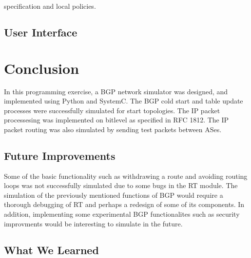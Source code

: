 specification and local policies. \hypertarget{index_sub_UI}{}\subsection{User Interface}\label{index_sub_UI}
\hypertarget{index_s_conclusion}{}\section{Conclusion}\label{index_s_conclusion}
In this programming exercise, a B\-G\-P network simulator was designed, and implemented using Python and System\-C. The B\-G\-P cold start and table update processes were successfully simulated for start topologies. The I\-P packet processesing was implemented on bitlevel as specified in R\-F\-C 1812. The I\-P packet routing was also simulated by sending test packets between A\-Ses. \hypertarget{index_sub_futureImprovements}{}\subsection{Future Improvements}\label{index_sub_futureImprovements}
Some of the basic functionality such as withdrawing a route and avoiding routing loops was not successfully simulated due to some bugs in the R\-T module. The simulation of the previously mentioned functions of B\-G\-P would require a thorough debugging of R\-T and perhaps a redesign of some of its components. In addition, implementing some experimental B\-G\-P functionalites such as security improvments would be interesting to simulate in the future. \hypertarget{index_sub_whatwelearned}{}\subsection{What We Learned}\label{index_sub_whatwelearned}
